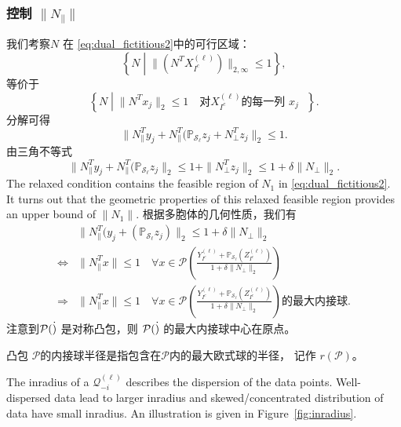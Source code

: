 \documentclass[main.tex]{subfiles}
\begin{document}
\subsubsection{控制 $\|N_{\parallel}\|$}
我们考察$N$ 在 \eqref{eq:dual_fictitious2}中的可行区域：
$$\left\{N \middle| \|(N^T X^{(\ell)}_{I^c})\|_{2,\infty} \leq 1\right\},$$
等价于
$$\left\{N \middle| \| N^T x_j\|_2 \leq 1 \quad\text{对$X^{(\ell)}_{I^c}$的每一列 $x_j$ }\right\}.$$
分解可得
$$\| N_{\parallel}^T y_j+N_{\parallel}^T (\mathbb{P}_{\mathcal{S}_{\ell}}z_j +
N_{\perp}^T z_j\|_2 \leq 1.$$
由三角不等式
\begin{equation}\label{eq:relax_constraint}
  \| N_{\parallel}^T y_j+N_{\parallel}^T (\mathbb{P}_{\mathcal{S}_{\ell}}z_j \|_2
  \leq 1+\|N_{\perp}^T z_j\|_2 \leq 1+\delta\|N_{\perp}\|_2.
\end{equation}
The relaxed condition contains the feasible region of $N_1$ in \eqref{eq:dual_fictitious2}.
It turns out that the geometric properties of this relaxed feasible region provides an upper bound of $\|N_1\|$.
根据多胞体的几何性质，我们有
\begin{align}
  & \| N_{\parallel}^T (y_j+ (\mathbb{P}_{\mathcal{S}_{\ell}}z_j) \|_2 \leq
  1+\delta\|N_{\perp}\|_2 \nonumber\\
  \Leftrightarrow & \|N_{\parallel}^T x\| \leq 1 \quad \forall x \in \mathcal{P}\left(\frac{Y_{I^c}^{(\ell)}+
  \mathbb{P}_{\mathcal{S}_{\ell}}(Z_{I^c}^{(\ell)})}{1+\delta\|N_{\perp}\|_2}\right)
  \nonumber\\
  \Rightarrow & \|N_{\parallel}^T x\| \leq 1 \quad \forall x \in \mathcal{P}\left(\frac{Y_{I^c}^{(\ell)}+
  \mathbb{P}_{\mathcal{S}_{\ell}}(Z_{I^c}^{(\ell)})}{1+\delta\|N_{\perp}\|_2}\right)
  \text{的最大内接球}.\label{eq:Geometric_dual}
\end{align}
注意到$\mathcal{P}(\dot)$ 是对称凸包，则 $\mathcal{P}(\dot)$ 的最大内接球中心在原点。

\begin{definition}[内接球半径]
凸包 $\mathcal{P}$的内接球半径是指包含在$\mathcal{P}$内的最大欧式球的半径，
记作 $r(\mathcal{P})$。 
\end{definition}
The inradius of a $\mathcal{Q}_{-i}^{(\ell)}$ describes the dispersion of the data points. Well-dispersed data lead to larger inradius and skewed/concentrated distribution of data have small inradius. An illustration is given in Figure~\ref{fig:inradius}.
\end{document}
